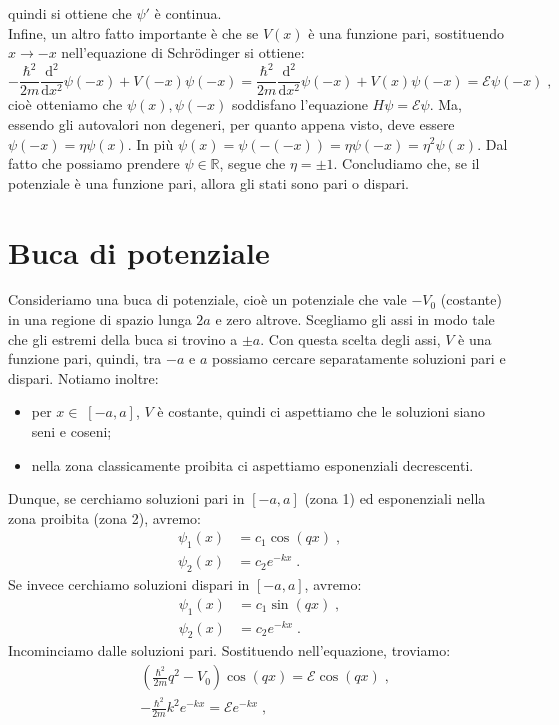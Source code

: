 \documentclass[10pt,a4paper]{report}
\theoremstyle{definition}
\numberwithin{equation}{section}
\newcommand{\diff}[1][]{\mathrm{d}#1}
\begin{document}
quindi si ottiene che $\psi'$ è continua. \\
Infine, un altro fatto importante è che se $V(x)$ è una funzione pari, sostituendo $x\to -x$ nell'equazione di Schrödinger si ottiene:
$$
-\frac{\hbar^2}{2m}\frac{\mathrm{d}^2}{\diff{x}^2}\psi(-x)+V(-x)\psi(-x)=\frac{\hbar^2}{2m}\frac{\mathrm{d}^2}{\diff{x}^2}\psi(-x)+V(x)\psi(-x)=\mathcal{E}\psi(-x)\;,
$$
cioè otteniamo che $\psi(x),\psi(-x)$ soddisfano l'equazione $H\psi=\mathcal{E}\psi$. Ma, essendo gli autovalori non degeneri, per quanto appena visto, deve essere $\psi(-x)=\eta\psi(x)$. In più $\psi(x)=\psi(-(-x))=\eta\psi(-x)=\eta^2\psi(x)$. Dal fatto che possiamo prendere $\psi\in\mathbb{R}$, segue che $\eta=\pm 1$. Concludiamo che, se il potenziale è una funzione pari, allora gli stati sono pari o dispari.
\section{Buca di potenziale}
Consideriamo una buca di potenziale, cioè un potenziale che vale $-V_0$ (costante) in una regione di spazio lunga $2a$ e zero altrove. Scegliamo gli assi in modo tale che gli estremi della buca si trovino a $\pm a$. Con questa scelta degli assi, $V$ è una funzione pari, quindi, tra $-a$ e $a$ possiamo cercare separatamente soluzioni pari e dispari. Notiamo inoltre:
\begin{itemize}
\item per $x\in\;[-a,a]$, $V$ è costante, quindi ci aspettiamo che le soluzioni siano seni e coseni;
\item nella zona classicamente proibita ci aspettiamo esponenziali decrescenti.
\end{itemize}
Dunque, se cerchiamo soluzioni pari in $[-a,a]$ (zona 1) ed esponenziali nella zona proibita (zona 2), avremo:
\begin{align*}
\psi_1(x) &= c_1\cos(qx)\;, \\
\psi_2(x) &= c_2 e^{-kx}\;.
\end{align*}
Se invece cerchiamo soluzioni dispari in $[-a,a]$, avremo:
\begin{align*}
\psi_1(x) &= c_1\sin(qx)\;, \\
\psi_2(x) &= c_2 e^{-kx}\;.
\end{align*}
Incominciamo dalle soluzioni pari. Sostituendo nell'equazione, troviamo:
\begin{align}
&\left(\frac{\hbar^2}{2m}q^2-V_0\right)\cos(qx) =\mathcal{E}\cos(qx)\;, \label{ch3_sol1} \\
&-\frac{\hbar^2}{2m}k^2e^{-kx}=\mathcal{E}e^{-kx}\;, \label{ch3_sol2}
\end{align}
\end{document}
